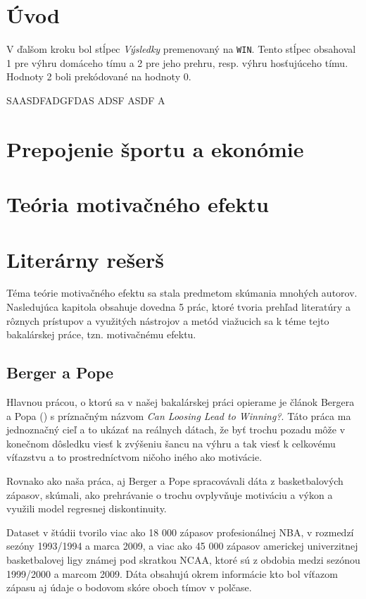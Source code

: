 \documentclass[
  digital, %
  oneside, %
  notable,   %
  lof,     %
  lot,     %
]{fithesis3}
\begin{document}
	\makeatletter
	\thesis@preamble %
	\makeatother
	
	\chapter*{Úvod}
	
	V ďalšom kroku bol stĺpec \textit{Výsledky} premenovaný na 	\texttt{WIN}. Tento stĺpec obsahoval 1 pre výhru domáceho tímu a 2 pre jeho prehru, resp. výhru hosťujúceho tímu. Hodnoty 2 boli prekódované na hodnoty 0. \parencite{merritt2014}
	
	SAASDFADGFDAS ADSF ASDF A \parencite{berger2011}

	\chapter{Prepojenie športu a ekonómie}

	\chapter{Teória motivačného efektu}

	\chapter{Literárny rešerš}
	Téma teórie motivačného efektu sa stala predmetom skúmania mnohých autorov. Nasledujúca kapitola obsahuje dovedna 5 prác, ktoré tvoria prehľad literatúry a rôznych prístupov a využitých nástrojov a metód viažucich sa k téme tejto bakalárskej práce, tzn. motivačnému efektu. 
	
		\section{Berger a Pope}
		Hlavnou prácou, o ktorú sa v našej bakalárskej práci opierame je článok Bergera a Popa (\citeyear{berger2011}) s príznačným názvom \textit{Can Loosing Lead to Winning?}. Táto práca ma jednoznačný cieľ a to ukázať na reálnych dátach, že byť trochu pozadu môže v konečnom dôsledku viesť k zvýšeniu šancu na výhru a tak viesť k celkovému víťazstvu a to prostredníctvom ničoho iného ako motivácie.
		
		Rovnako ako naša práca, aj Berger a Pope spracovávali dáta z basketbalových zápasov, skúmali, ako prehrávanie o trochu ovplyvňuje motiváciu a výkon a využili model regresnej diskontinuity. 
		
		Dataset v štúdii tvorilo viac ako 18 000 zápasov profesionálnej NBA, v rozmedzí sezóny 1993/1994 a marca 2009, a viac ako 45 000 zápasov americkej univerzitnej basketbalovej ligy známej pod skratkou NCAA, ktoré sú z obdobia medzi sezónou 1999/2000 a marcom 2009. \parencite[s.~818]{berger2011} Dáta obsahujú okrem informácie kto bol víťazom zápasu aj údaje o bodovom skóre oboch tímov v polčase.
		
\end{document}
